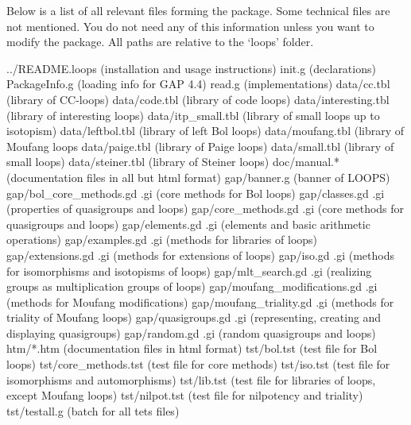 
Below is a list of all relevant files forming the {\LOOPS} package. Some
technical files are not mentioned. You do not need any of this information
unless you want to modify the package. All paths are relative to the
`loops' folder.

\begintt
../README.loops (installation and usage instructions)
init.g (declarations)
PackageInfo.g (loading info for GAP 4.4)
read.g (implementations)
data/cc.tbl (library of CC-loops)
data/code.tbl (library of code loops)
data/interesting.tbl (library of interesting loops)
data/itp_small.tbl (library of small loops up to isotopism)
data/leftbol.tbl (library of left Bol loops)
data/moufang.tbl (library of Moufang loops
data/paige.tbl (library of Paige loops)
data/small.tbl (library of small loops)
data/steiner.tbl (library of Steiner loops)
doc/manual.* (documentation files in all but html format)
gap/banner.g (banner of LOOPS)
gap/bol_core_methods.gd .gi (core methods for Bol loops)
gap/classes.gd .gi (properties of quasigroups and loops)
gap/core_methods.gd .gi (core methods for quasigroups and loops)
gap/elements.gd .gi (elements and basic arithmetic operations)
gap/examples.gd .gi (methods for libraries of loops)
gap/extensions.gd .gi (methods for extensions of loops)
gap/iso.gd .gi (methods for isomorphisms and isotopisms of loops)
gap/mlt_search.gd .gi (realizing groups as multiplication groups of loops)
gap/moufang_modifications.gd .gi (methods for Moufang modifications)
gap/moufang_triality.gd .gi (methods for triality of Moufang loops)
gap/quasigroups.gd .gi (representing, creating and displaying quasigroups)
gap/random.gd .gi (random quasigroups and loops)
htm/*.htm (documentation files in html format)
tst/bol.tst (test file for Bol loops)
tst/core_methods.tst (test file for core methods)
tst/iso.tst (test file for isomorphisms and automorphisms)
tst/lib.tst (test file for libraries of loops, except Moufang loops)
tst/nilpot.tst (test file for nilpotency and triality)
tst/testall.g (batch for all tets files)
\endtt
